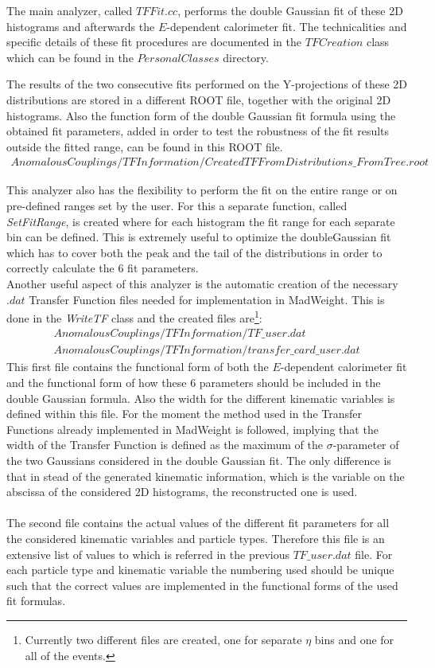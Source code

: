 The main analyzer, called $TFFit.cc$, performs the double Gaussian fit of these 2D histograms and afterwards the $E$-dependent calorimeter fit. The technicalities and specific details of these fit procedures are documented in the $TFCreation$ class which can be found in the $PersonalClasses$ directory.

The results of the two consecutive fits performed on the Y-projections of these 2D distributions are stored in a different ROOT file, together with the original 2D histograms. Also the function form of the double Gaussian fit formula using the obtained fit parameters, added in order to test the robustness of the fit results outside the fitted range, can be found in this ROOT file.
\begin{eqnarray*}
 AnomalousCouplings/TFInformation/CreatedTFFromDistributions\_FromTree.root
\end{eqnarray*}

This analyzer also has the flexibility to perform the fit on the entire range or on pre-defined ranges set by the user. For this a separate function, called \textit{SetFitRange}, is created where for each histogram the fit range for each separate bin can be defined. This is extremely useful to optimize the doubleGaussian fit which has to cover both the peak and the tail of the distributions in order to correctly calculate the $6$ fit parameters.\\
Another useful aspect of this analyzer is the automatic creation of the necessary $.dat$ Transfer Function files needed for implementation in MadWeight. This is done in the \textit{WriteTF} class and the created files are\footnote{Currently two different files are created, one for separate $\eta$ bins and one for all of the events.}:
\begin{eqnarray*}
 AnomalousCouplings/TFInformation/TF\_user.dat \\
 AnomalousCouplings/TFInformation/transfer\_card\_user.dat
\end{eqnarray*}
This first file contains the functional form of both the $E$-dependent calorimeter fit and the functional form of how these $6$ parameters should be included in the double Gaussian formula. Also the width for the different kinematic variables is defined within this file. For the moment the method used in the Transfer Functions already implemented in MadWeight is followed, implying that the width of the Transfer Function is defined as the maximum of the $\sigma$-parameter of the two Gaussians considered in the double Gaussian fit. The only difference is that in stead of the generated kinematic information, which is the variable on the abscissa of the considered 2D histograms, the reconstructed one is used.\\
\\
The second file contains the actual values of the different fit parameters for all the considered kinematic variables and particle types. Therefore this file is an extensive list of values to which is referred in the previous $TF\_user.dat$ file. For each particle type and kinematic variable the numbering used should be unique such that the correct values are implemented in the functional forms of the used fit formulas.

